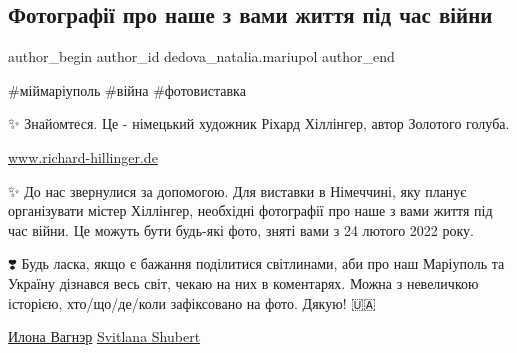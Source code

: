  
 
 
 
 

\subsection{Фотографії про наше з вами життя під час війни}
\label{sec:30_01_2023.fb.dedova_natalia.mariupol.1.fotograf__pro_nashe}

\ifcmt
 author_begin
   author_id dedova_natalia.mariupol
 author_end
\fi

\#міймаріуполь
\#війна
\#фотовиставка

✨ Знайомтеся. Це - німецький художник Ріхард Хіллінгер, автор Золотого голуба. 

\url{www.richard-hillinger.de}

✨ До нас звернулися за допомогою. Для виставки в Німеччині, яку планує
організувати містер Хіллінгер, необхідні фотографії про наше з вами життя під
час війни. Це можуть бути будь-які фото, зняті вами з 24 лютого 2022 року. 

❣️ Будь ласка, якщо є бажання поділитися світлинами, аби про наш Маріуполь та
Україну дізнався весь світ, чекаю на них в коментарях. Можна з невеличкою
історією, хто/що/де/коли зафіксовано на фото. Дякую! 🇺🇦

\href{https://www.facebook.com/IlonaRommanova}{Илона Вагнэр}
\href{https://www.facebook.com/profile.php?id=100024229293185}{Svitlana Shubert}

